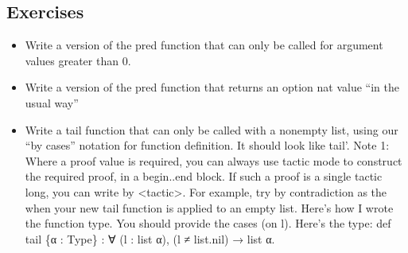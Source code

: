 \documentclass[letterpaper,10pt,english]{sphinxmanual}
\begin{document}
\begin{sphinxVerbatim}[commandchars=\\\{\}]
               
     
 
 

  \PYG{o}{[}\PYG{o}{]}      
  \PYG{o}{[}\PYG{o}{]}          
  \PYG{o}{[}\PYG{o}{]}                     
\end{sphinxVerbatim}


\subsection{Exercises}
\label{\detokenize{A_03_Recursive_Types:exercises}}\begin{itemize}
\item {} 
\sphinxAtStartPar
Write a version of the pred function that can only be called for argument values greater than 0.

\item {} 
\sphinxAtStartPar
Write a version of the pred function that returns an option nat value “in the usual way”

\item {} 
\sphinxAtStartPar
Write a tail function that can only be called with a non\sphinxhyphen{}empty list, using our “by cases” notation for function definition. It should look like tail’. Note 1: Where a proof value is required, you can always use tactic mode to construct the required proof, in a begin..end block. If such a proof is a single tactic long, you can write by <tactic>. For example, try by contradiction as the  when your new tail function is applied to an empty list. Here’s how I wrote the function type. You should provide the cases (on l). Here’s the type: def tail \{α : Type\} : ∀ (l : list α), (l ≠ list.nil) → list α.

\end{itemize}
\end{document}

